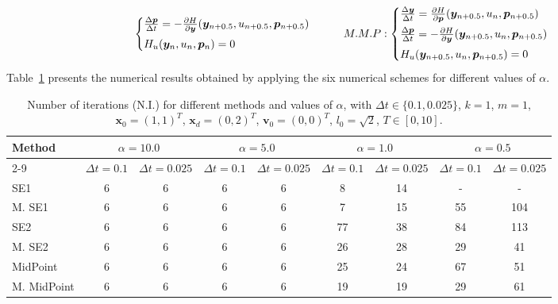 \documentclass[a4paper, 10pt]{article}
\begin{document}
\begin{equation}
\begin{array}{c@{\hspace{2em}}c}
\begin{cases}
             \frac{\Delta\bm{p}}{\Delta t} = -\frac{\partial H}{\partial \bm{y}}(\bm{y}_{n+0.5}, u_{n+0.5}, \bm{p}_{n+0.5}) \\[4pt]
             H_{u} (\bm{y}_n, u_{n}, \bm{p}_{n})= 0
        \end{cases} &  M.M.P:
        \begin{cases}
            \frac{\Delta\bm{y}}{\Delta t} = \frac{\partial H}{\partial \bm{p}}(\bm{y}_{n+0.5}, u_{n}, \bm{p}_{n+0.5}) \\[4pt]
             \frac{\Delta\bm{p}}{\Delta t} = -\frac{\partial H}{\partial \bm{y}}(\bm{y}_{n+0.5}, u_{n}, \bm{p}_{n+0.5}) \\[4pt]
             H_{u} (\bm{y}_{n+0.5}, u_{n}, \bm{p}_{n+0.5})= 0
        \end{cases} \\
\end{array}\label{eq:equation}
\end{equation}
Table~\ref{tab:alpha_methods} presents the numerical results obtained by applying the six numerical schemes for different values of $\alpha$.

\begin{table}[h!]
      \centering
      \begin{tabular}{| l | c | c | c | c | c | c | c | c |}
        \toprule
        \multirow{2}{*}{Method} & \multicolumn{2}{c|}{$\alpha = 10.0$} & \multicolumn{2}{c|}{$\alpha = 5.0$} & \multicolumn{2}{c|}{$\alpha = 1.0$} & \multicolumn{2}{c|}{$\alpha = 0.5$} \\
        \cmidrule{2-9}
        & $\Delta t = 0.1 $& $\Delta t = 0.025 $& $\Delta t = 0.1 $& $\Delta t = 0.025 $& $\Delta t = 0.1 $& $\Delta t = 0.025 $& $\Delta t = 0.1 $& $\Delta t = 0.025 $\\
        \midrule
        SE1 & 6 & 6 & 6 & 6 & 8 & 14 & - & - \\
        M. SE1 & 6 & 6 & 6 & 6 & 7 & 15 & 55 & 104 \\
        \midrule
        SE2 & 6 & 6 & 6 & 6 & 77 & 38 & 84 & 113 \\
        M. SE2 & 6 & 6 & 6 & 6 & 26 & 28 & 29 & 41 \\
        \midrule
        MidPoint & 6 & 6 & 6 & 6 & 25 & 24 & 67 & 51 \\
        M. MidPoint & 6 & 6 & 6 & 6 & 19 & 19 & 29 & 61 \\
        \bottomrule
      \end{tabular}
      \caption{Number of iterations (N.I.) for different methods and values of \(\alpha\), with $\Delta t \in \{0.1, 0.025\}$, $k=1$, $m=1$, $\bm{x}_{0} = (1,1)^{T}$, $\bm{x}_{d} = (0,2)^{T}$, $\bm{v}_{0} =(0,0)^{T}$, $l_{0} = \sqrt{2}$, $T \in [0,10]$.}
      \label{tab:alpha_methods}
    \end{table}
\end{document}
